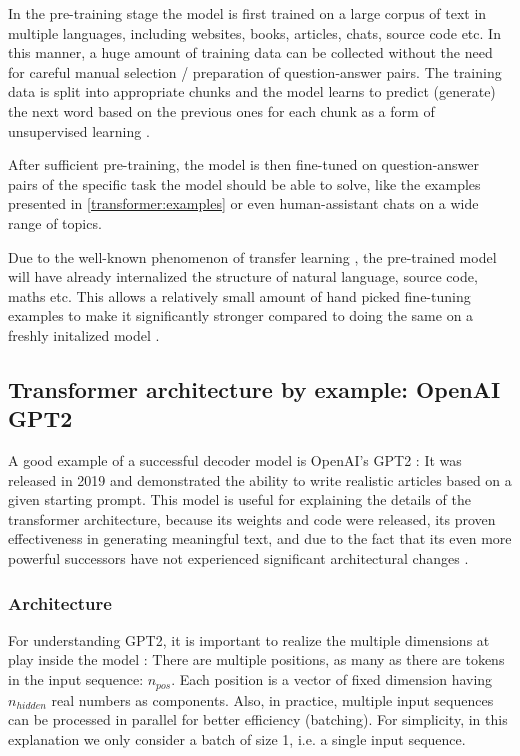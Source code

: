 In the pre-training stage the model is first trained on a large corpus of text in multiple languages, including websites, books, articles, chats, source code etc. In this manner, a huge amount of training data can be collected without the need for careful manual selection / preparation of question-answer pairs. The training data is split into appropriate chunks and the model learns to predict (generate) the next word based on the previous ones for each chunk as a form of unsupervised learning .

After sufficient pre-training, the model is then fine-tuned on question-answer pairs of the specific task the model should be able to solve, like the examples presented in \ref{transformer:examples} or even human-assistant chats on a wide range of topics.

Due to the well-known phenomenon of transfer learning \cite{transferlearning}, the pre-trained model will have already internalized the structure of natural language, source code, maths etc. 
This allows a relatively small amount of hand picked fine-tuning examples to make it significantly stronger compared to doing the same on a freshly initalized model .

\subsection{Transformer architecture by example: OpenAI GPT2}

A good example of a successful decoder model is OpenAI's GPT2 \cite{unsupervisedmultitask} \cite{OpenAI2019BetterLM} \cite[source code]{HuggingFaceGPT2}: It was released in 2019 and demonstrated the ability to write realistic articles based on a given starting prompt. This model is useful for explaining the details of the transformer architecture, because its weights and code were released, its proven effectiveness in generating meaningful text, and due to the fact that its even more powerful successors have not experienced significant architectural changes \cite{OpenGenus2023GPTComparison}.

\subsubsection{Architecture}


For understanding GPT2, it is important to realize the multiple dimensions at play inside the model \cite{alammar-gpt2} :
There are multiple positions, as many as there are tokens in the input sequence: $n_{pos}$.
Each position is a vector of fixed dimension having $n_{hidden}$ real numbers as components.
Also, in practice, multiple input sequences can be processed in parallel for better efficiency (batching).
For simplicity, in this explanation we only consider a batch of size 1, i.e. a single input sequence.

